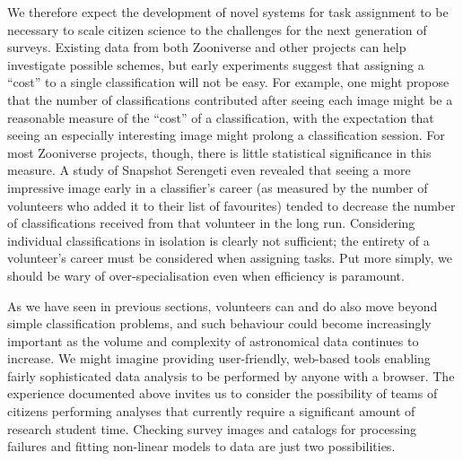 \documentclass{ar2e}
\begin{document}
We therefore expect the development of novel systems for task assignment to be
necessary to scale citizen science to the challenges for the next generation of
surveys. Existing data from both Zooniverse and other projects can help
investigate possible schemes, but early experiments suggest that assigning a
``cost'' to a single classification will not be easy. For example, one might
propose that the number of classifications contributed after seeing each image
might be a reasonable measure of the ``cost'' of a classification, with the
expectation that seeing an especially interesting image might prolong a
classification session. For most Zooniverse projects, though, there is little
statistical significance in this measure. A study of Snapshot Serengeti even
revealed that seeing a more impressive image early in a classifier's career (as
measured by the number of volunteers who added it to their list of favourites)
tended to decrease the number of classifications received from that volunteer in
the long run. Considering individual classifications in isolation is clearly not
sufficient; the entirety of a volunteer's career must be considered when
assigning tasks. Put more simply, we should be wary of over-specialisation even
when efficiency is paramount. 





As we have seen in previous sections, volunteers can and do also move beyond
simple classification problems, and such behaviour could become increasingly
important as the volume and complexity of astronomical data continues to
increase. 
%
% 
% 
% 
% 
%
We might imagine providing user-friendly, web-based tools enabling  fairly
sophisticated data analysis to be performed by anyone with a browser. The
experience documented above invites us to consider the possibility of teams of
citizens  performing analyses that currently require a significant amount of
research student time. Checking survey images and catalogs  for processing
failures and fitting non-linear models to data are just two possibilities.
\end{document}
